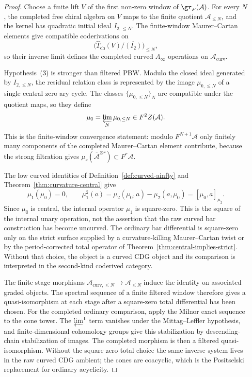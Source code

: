 \begin{proof}
Choose a finite lift $V$ of the first non-zero window of
$\gr_F(\mathcal{A})$.  For every $N$, the completed free chiral
algebra on $V$ maps to the finite quotient $\mathcal{A}_{\le N}$, and
the kernel has quadratic initial ideal $I_{2,\le N}$.  The
finite-window Maurer--Cartan elements give compatible coderivations on
\[
\bigl(\widehat{T}_{\mathrm{ch}}(V)/\overline{(I_2)}\bigr)_{\le N},
\]
so their inverse limit defines the completed curved $A_\infty$
operations on $\mathcal{A}_{\mathrm{curv}}$.

Hypothesis~(3) is stronger than filtered PBW.  Modulo the closed ideal
generated by $I_{2,\le N}$, the residual relation class is represented
by the image $\mu_{0,\le N}$ of a single central zero-ary cycle.  The
classes $\{\mu_{0,\le N}\}_N$ are compatible under the quotient maps,
so they define
\[
\mu_0=\varprojlim_N\mu_{0,\le N}\in F^2Z(\mathcal{A}).
\]
This is the finite-window convergence statement: modulo
$F^{N+1}\mathcal{A}$ only finitely many components of the completed
Maurer--Cartan element contribute, because the strong filtration gives
\(\mu_r(\bar{\mathcal{A}}^{\otimes r})\subset F^r\mathcal{A}\).

The low curved identities of
Definition~\ref{def:curved-ainfty} and
Theorem~\ref{thm:curvature-central} give
\begin{equation}\label{eq:fc-curved-identity}
\mu_1(\mu_0)=0,\qquad
\mu_1^2(a)=\mu_2(\mu_0,a)-\mu_2(a,\mu_0)=[\mu_0,a]_{\mu_2}.
\end{equation}
Since $\mu_0$ is central, the internal operator $\mu_1$ is
square-zero.  This is the square of the internal unary operation, not
the assertion that the raw curved bar construction has become
uncurved.  The ordinary bar differential is square-zero only on the
strict surface supplied by a curvature-killing Maurer--Cartan twist or
by the period-corrected total operator of
Theorem~\ref{thm:central-implies-strict}.  Without that choice, the
object is a curved CDG object and its comparison is interpreted in the
second-kind coderived category.

The finite-stage morphisms
$\mathcal{A}_{\mathrm{curv},\le N}\to\mathcal{A}_{\le N}$ induce the
identity on associated graded objects.  The spectral sequence of a
finite filtered window therefore gives a quasi-isomorphism at each
stage after a square-zero total differential has been chosen.  For the
completed ordinary comparison, apply the Milnor exact sequence to the
cone tower.  The $\varprojlim^1$ term vanishes under the
Mittag--Leffler hypothesis, and finite-dimensional cohomology groups
give this stabilization by descending-chain stabilization of images.
The completed morphism is then a filtered quasi-isomorphism.  Without
the square-zero total choice the same inverse system lives in the raw
curved CDG ambient; the cones are coacyclic, which is the Positselski
replacement for ordinary acyclicity.
\end{proof}

